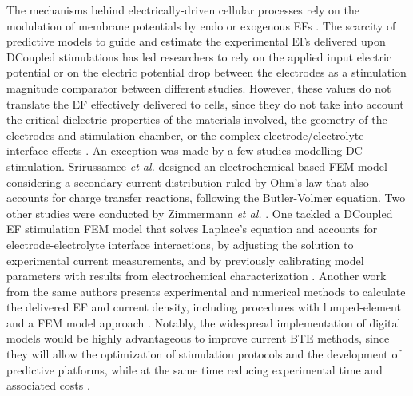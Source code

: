 The mechanisms behind electrically-driven cellular processes rely on the modulation of membrane potentials by endo or exogenous \ac{EFs} \cite{Thrivikraman2018-su}. The scarcity of predictive models to guide and estimate the experimental \acs{EFs} delivered upon \ac{DCoupled} stimulations has led researchers to rely on the applied input electric potential or on the electric potential drop between the electrodes as a stimulation magnitude comparator between different studies. However, these values do not translate the \acs{EF} effectively delivered to cells, since they do not take into account the critical dielectric properties of the materials involved, the geometry of the electrodes and stimulation chamber, or the complex electrode/electrolyte interface effects \cite{Guette-Marquet2021-rp}. An exception was made by a few studies modelling DC stimulation. Srirussamee \textit{et al.} \cite{Srirussamee2021-cj} designed an electrochemical-based \ac{FEM} model considering a secondary current distribution ruled by Ohm’s law that also accounts for charge transfer reactions, following the Butler-Volmer equation. Two other studies were conducted by Zimmermann \textit{et al.} \cite{Zimmermann2021-fx, Zimmermann2023-gm}. One tackled a \ac{DCoupled} \ac{EF} stimulation \ac{FEM} model that solves Laplace’s equation and accounts for electrode-electrolyte interface interactions, by adjusting the solution to experimental current measurements, and by previously calibrating model parameters with results from electrochemical characterization \cite{Zimmermann2021-fx}. Another work from the same authors presents experimental and numerical methods to calculate the delivered \ac{EF} and current density, including procedures with lumped-element and a \ac{FEM} model approach \cite{Zimmermann2023-gm}. Notably, the widespread implementation of digital models would be highly advantageous to improve current \ac{BTE} methods, since they will allow the optimization of stimulation protocols and the development of predictive platforms, while at the same time reducing experimental time and associated costs \cite{Moller2021-kr, Geris2018-tz}.

